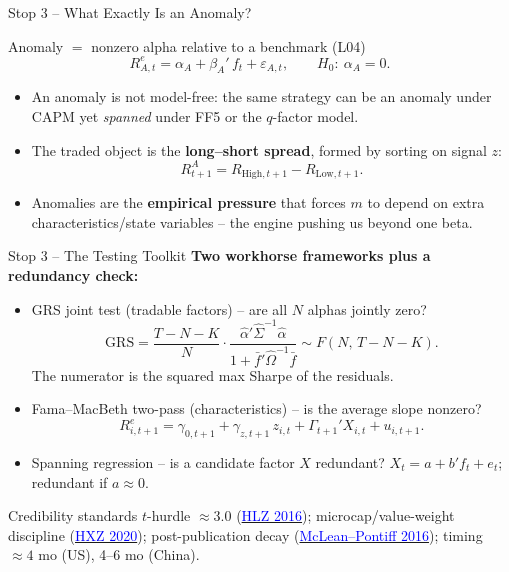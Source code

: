 \documentclass{beamer}
\begin{document}
\begin{frame}{Stop 3 -- What Exactly Is an Anomaly?}
\begin{block}{Anomaly $=$ nonzero alpha relative to a benchmark (L04)}
\[
R^e_{A,t}=\alpha_A+\beta_A'\,f_t+\varepsilon_{A,t},
\qquad
H_0:\ \alpha_A=0.
\]
\end{block}
\begin{itemize}
  \item An anomaly is \alert{not model-free}: the same strategy can be an anomaly under CAPM yet \emph{spanned} under FF5 or the $q$-factor model.
  \item The traded object is the \textbf{long--short spread}, formed by sorting on signal $z$:
  \[
  R^A_{t+1}=R_{\text{High},t+1}-R_{\text{Low},t+1}.
  \]
  \item Anomalies are the \textbf{empirical pressure} that forces $m$ to depend on extra characteristics/state variables -- the engine pushing us beyond one beta.
\end{itemize}
\end{frame}

\begin{frame}{Stop 3 -- The Testing Toolkit}
\textbf{Two workhorse frameworks plus a redundancy check:}
\begin{itemize}
  \item \alert{GRS joint test} (tradable factors) -- are all $N$ alphas jointly zero?
  \[
  \mathrm{GRS}=\frac{T-N-K}{N}\cdot\frac{\hat\alpha'\hat\Sigma^{-1}\hat\alpha}{1+\bar f'\hat\Omega^{-1}\bar f}\sim F(N,\,T-N-K).
  \]
  The numerator is the squared \alert{max Sharpe of the residuals}.
  \item \alert{Fama--MacBeth two-pass} (characteristics) -- is the average slope nonzero?
  \[
  R^e_{i,t+1}=\gamma_{0,t+1}+\gamma_{z,t+1}\,z_{i,t}+\Gamma_{t+1}'X_{i,t}+u_{i,t+1}.
  \]
  \item \alert{Spanning regression} -- is a candidate factor $X$ redundant? $X_t=a+b'f_t+e_t$; redundant if $a\approx 0$.
\end{itemize}
\begin{block}{Credibility standards}
$t$-hurdle $\approx 3.0$ (\href{https://doi.org/10.1093/rfs/hhv059}{\textcolor{blue}{HLZ 2016}}); microcap/value-weight discipline (\href{https://doi.org/10.1093/rfs/hhy131}{\textcolor{blue}{HXZ 2020}}); post-publication decay (\href{https://doi.org/10.1111/jofi.12365}{\textcolor{blue}{McLean--Pontiff 2016}}); timing $\approx 4$ mo (US), 4--6 mo (China).
\end{block}
\end{frame}
\end{document}
